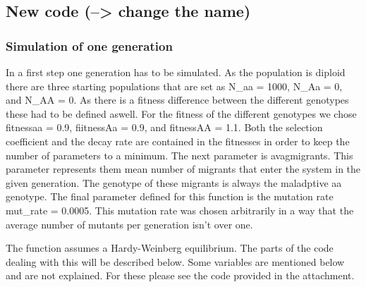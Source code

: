 \documentclass[
]{article}
\begin{document}
\hypertarget{new-code-change-the-name}{%
\subsection{New code (--\textgreater{} change the
name)}\label{new-code-change-the-name}}

\hypertarget{simulation-of-one-generation}{%
\subsubsection{Simulation of one
generation}\label{simulation-of-one-generation}}

In a first step one generation has to be simulated. As the population is
diploid there are three starting populations that are set as N\_aa =
1000, N\_Aa = 0, and N\_AA = 0. As there is a fitness difference between
the different genotypes these had to be defined aswell. For the fitness
of the different genotypes we chose fitnessaa = 0.9, fiitnessAa = 0.9,
and fitnessAA = 1.1. Both the selection coefficient and the decay rate
are contained in the fitnesses in order to keep the number of parameters
to a minimum. The next parameter is avagmigrants. This parameter
represents them mean number of migrants that enter the system in the
given generation. The genotype of these migrants is always the
maladptive aa genotype. The final parameter defined for this function is
the mutation rate mut\_rate = 0.0005. This mutation rate was chosen
arbitrarily in a way that the average number of mutants per generation
isn't over one.

The function assumes a Hardy-Weinberg equilibrium. The parts of the code
dealing with this will be described below. Some variables are mentioned
below and are not explained. For these please see the code provided in
the attachment.
\end{document}

